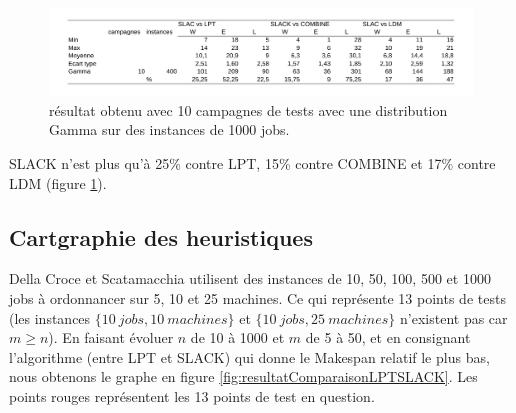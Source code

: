 \documentclass[a4paper,12pt]{report}
\theoremstyle{plain}				%
\theoremstyle{definition}				%
\begin{document}
\begin{figure}
{\centering
\includegraphics[width=\columnwidth]{7_Resultat_Reproduction10Gamma1000.pdf}
\caption{résultat obtenu avec 10 campagnes de tests avec une distribution Gamma sur des instances de 1000 jobs.}
\label{fig:resultatReproduction10Gamma1000}
\par}
\end{figure}

SLACK n'est plus qu'à 25\% contre LPT, 15\% contre COMBINE et 17\% contre LDM (figure \ref{fig:resultatReproduction10Gamma1000}).


\subsection{Cartgraphie des heuristiques}
\label{ssec:resultatsCartographie}

Della Croce et Scatamacchia utilisent des instances de 10, 50, 100, 500 et 1000 jobs à ordonnancer sur 5, 10 et 25 machines. 
Ce qui représente 13 points de tests 
  (les instances 
  $\{10~jobs,10~machines\}$ et 
  $\{10~jobs,25~machines\}$ n'existent pas car $m\geq n$).
En faisant évoluer $n$ de 10 à 1000 et $m$ de 5 à 50, 
  et en consignant l'algorithme (entre LPT et SLACK) qui donne 
  le Makespan relatif le plus bas, nous obtenons le graphe en figure \ref{fig:resultatComparaisonLPTSLACK}.
Les points rouges représentent les 13 points de test en question.
 
\end{document}
